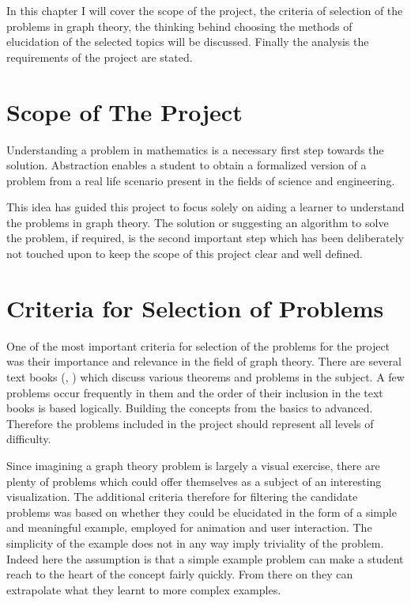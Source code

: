 
In this chapter I will cover the scope of the project, the criteria of selection of the
problems in graph theory, the thinking behind choosing the methods of
elucidation of the selected topics will be discussed. Finally the analysis
the requirements of the project are stated.


\section{Scope of The Project}
\label{requirements: scope}
Understanding a problem in mathematics is a necessary first step towards the solution.
Abstraction enables a student to obtain a formalized version of a
problem from a real life scenario present in the fields of science and engineering.

This idea has guided this project to focus solely on aiding a learner to
understand the problems in graph theory. The solution or suggesting an
algorithm to solve the problem, if required, is the second important step which
has been deliberately not touched upon to keep the scope of this project
clear and well defined.


\section{Criteria for Selection of Problems}
\label{section: selectionCriteria}
One of the most important criteria for selection of the problems for the
project was their importance and relevance in the field of graph
theory. There are several text books (\cite{Newman10}, 
\cite{KleinbergTardos06}) which discuss various theorems and
problems in the subject. A few problems occur frequently in them and the order of their inclusion in the text books is based
logically.  Building the concepts from the basics to advanced. Therefore the
problems included in the project should represent all levels of difficulty.

Since imagining a graph theory problem is largely a visual exercise, there are plenty of problems which could offer themselves as a subject of an
interesting visualization. The additional criteria therefore for filtering the
candidate problems was based on whether they could be elucidated in the form of a
simple and meaningful example, employed for animation and user
interaction. The simplicity of the example does not in any way imply
triviality of the problem. Indeed here the assumption is that a simple example
problem can make a student reach to the heart of the concept fairly quickly. From there on they can extrapolate what they learnt to more
complex examples.

